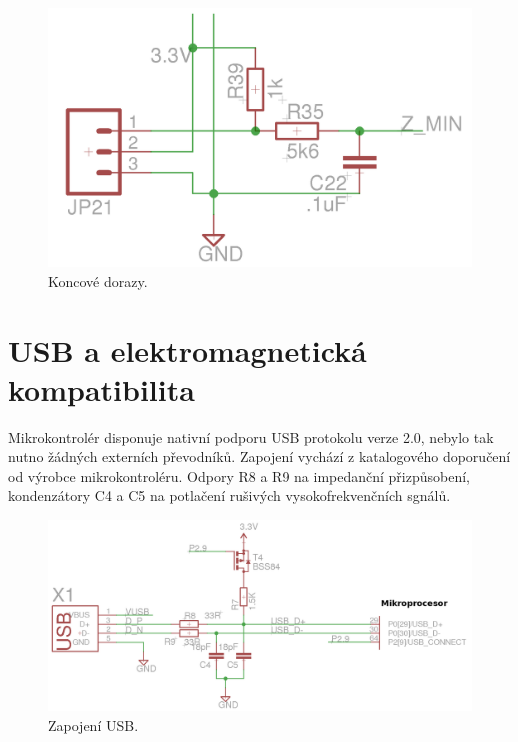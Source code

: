 \begin{figure}[h!]

  \centering
    \includegraphics[width=0.6\linewidth]{obrazky/endstops.png}%
    \caption{Koncové dorazy.}
\end{figure}



\section{USB a elektromagnetická kompatibilita}

Mikrokontrolér disponuje nativní podporu USB protokolu verze 2.0, nebylo tak nutno žádných externích převodníků. Zapojení vychází z katalogového doporučení od výrobce mikrokontroléru. Odpory R8 a R9 na impedanční přizpůsobení, kondenzátory C4 a C5 na potlačení rušivých vysokofrekvenčních sgnálů.

\begin{figure}[h!]

  \centering
    \includegraphics[width=0.8\linewidth]{obrazky/usb.png}%
    \caption{Zapojení USB.}
\end{figure}

